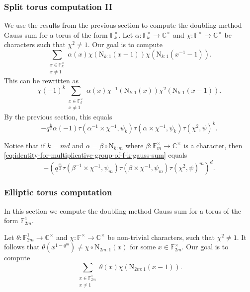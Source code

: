 \documentclass[12pt, reqno]{amsart}
\theoremstyle{definition}
\theoremstyle{definition}
\theoremstyle{definition}
\newcommand{\cComplex}{\mathbb{C}}
\newcommand{\multiplicativegroup}[1]{#1^{\times}}
\newcommand{\fieldCharacter}{\psi}
\newcommand{\FieldNorm}[2]{\mathrm{N}_{#1:#2}}
\newcommand{\finiteField}{\mathbb{F}}
\newcommand{\finiteFieldExtension}[1]{\finiteField_{#1}}
\newcommand{\GaussSumCharacter}[3]{\tau\left(#1 \times #2, #3\right)}
\begin{document}
\subsubsection{Split torus computation II}
We use the results from the previous section to compute the doubling method Gauss sum for a torus of the form $\multiplicativegroup{\finiteFieldExtension{k}}$. Let $\alpha \colon \multiplicativegroup{\finiteFieldExtension{k}} \to \multiplicativegroup{\cComplex}$ and $\chi \colon \multiplicativegroup{\finiteField} \to \multiplicativegroup{\cComplex}$ be characters such that $\chi^2 \ne 1$. Our goal is to compute $$\sum_{\substack{x \in \multiplicativegroup{\finiteFieldExtension{k}}\\
		x \ne 1}} \alpha \left(x\right) \chi\left(\FieldNorm{k}{1}\left(x - 1\right)\right) \chi\left(\FieldNorm{k}{1}\left(x^{-1} - 1\right)\right).$$
This can be rewritten as
$$\chi\left(-1\right)^k \sum_{\substack{x \in \multiplicativegroup{\finiteFieldExtension{k}}\\
		x \ne 1}} \alpha \left(x\right) \chi^{-1}\left(\FieldNorm{k}{1}\left(x\right)\right) \chi^2\left(\FieldNorm{k}{1}\left(x - 1\right)\right).$$
By the previous section, this equals
\begin{equation}\label{eq:identity-for-multiplicative-group-of-f-k-gauss-sum}
	-q^{\frac{k}{2}} \alpha\left(-1\right)  \GaussSumCharacter{\alpha^{-1}}{\chi^{-1}}{\fieldCharacter_k} \GaussSumCharacter{\alpha}{\chi^{-1}}{\fieldCharacter_k} \tau\left(\chi^2, \fieldCharacter\right)^k.
\end{equation}

Notice that if $k = md$ and $\alpha = \beta \circ \FieldNorm{k}{m}$ where $\beta \colon \multiplicativegroup{\finiteFieldExtension{m}} \to \multiplicativegroup{\cComplex}$ is a character, then \eqref{eq:identity-for-multiplicative-group-of-f-k-gauss-sum} equals
$$-\left(q^{\frac{m}{2}} \GaussSumCharacter{\beta^{-1}}{\chi^{-1}}{\fieldCharacter_m} \GaussSumCharacter{\beta}{\chi^{-1}}{\fieldCharacter_m} \tau\left(\chi^2, \fieldCharacter\right)^m\right)^{d}.$$

\subsubsection{Elliptic torus computation}
In this section we compute the doubling method Gauss sum for a torus of the form $\finiteFieldExtension{2m}^1$.

Let $\theta \colon \finiteFieldExtension{2m}^1 \to \multiplicativegroup{\cComplex}$ and $\chi \colon \multiplicativegroup{\finiteField} \to \multiplicativegroup{\cComplex}$ be non-trivial characters, such that $\chi^2 \ne 1$. It follows that $\theta\left(x^{1-q^m}\right) \ne \chi \circ \FieldNorm{2m}{1}\left(x\right)$ for some $x \in \multiplicativegroup{\finiteFieldExtension{2m}}$. Our goal is to compute $$\sum_{\substack{x \in \finiteFieldExtension{2m}^1\\
		x \ne 1}} \theta \left(x\right) \chi\left(\FieldNorm{2m}{1}\left(x - 1\right)\right).$$
\end{document}
